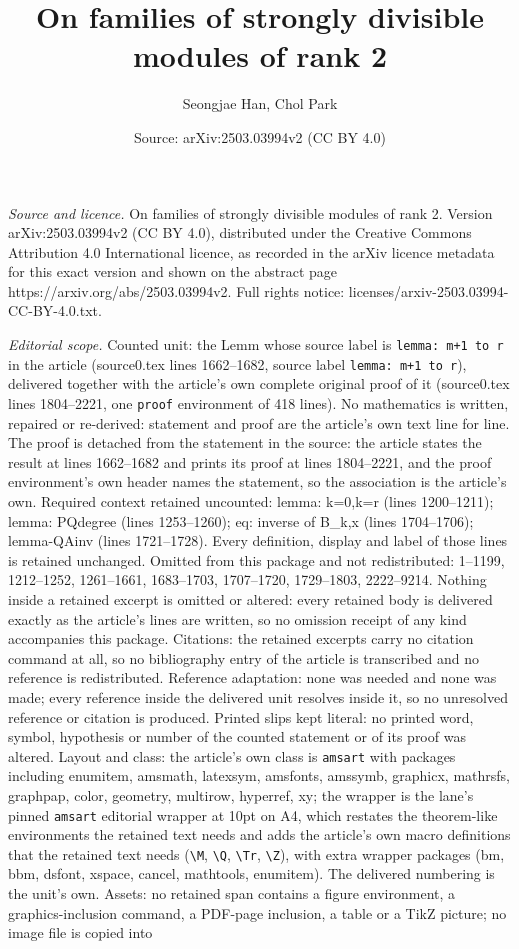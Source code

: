 \documentclass[10pt,a4paper]{amsart}
\title[On families of strongly divisible modules of rank 2]{On families of strongly divisible modules of rank 2}
\author{Seongjae Han, Chol Park}
\date{Source: arXiv:2503.03994v2 (CC BY 4.0)}
\begin{document}
\maketitle

\noindent\emph{Source and licence.} On families of strongly divisible modules of rank 2. Version arXiv:2503.03994v2 (CC BY 4.0), distributed under the Creative Commons Attribution 4.0 International licence, as recorded in the arXiv licence metadata for this exact version and shown on the abstract page https://arxiv.org/abs/2503.03994v2. Full rights notice: licenses/arxiv-2503.03994-CC-BY-4.0.txt.\par\smallskip

\noindent\textit{Editorial scope.} Counted unit: the Lemm whose source label is \texttt{lemma: m+1 to r} in the article (source0.tex lines 1662--1682, source label \texttt{lemma: m+1 to r}), delivered together with the article's own complete original proof of it (source0.tex lines 1804--2221, one \texttt{proof} environment of 418 lines). No mathematics is written, repaired or re-derived: statement and proof are the article's own text line for line. The proof is detached from the statement in the source: the article states the result at lines 1662--1682 and prints its proof at lines 1804--2221, and the proof environment's own header names the statement, so the association is the article's own. Required context retained uncounted: lemma: k=0,k=r (lines 1200--1211); lemma: PQdegree (lines 1253--1260); eq: inverse of B\_k,x (lines 1704--1706); lemma-QAinv (lines 1721--1728). Every definition, display and label of those lines is retained unchanged. Omitted from this package and not redistributed: 1--1199, 1212--1252, 1261--1661, 1683--1703, 1707--1720, 1729--1803, 2222--9214. Nothing inside a retained excerpt is omitted or altered: every retained body is delivered exactly as the article's lines are written, so no omission receipt of any kind accompanies this package. Citations: the retained excerpts carry no citation command at all, so no bibliography entry of the article is transcribed and no reference is redistributed. Reference adaptation: none was needed and none was made; every reference inside the delivered unit resolves inside it, so no unresolved reference or citation is produced. Printed slips kept literal: no printed word, symbol, hypothesis or number of the counted statement or of its proof was altered. Layout and class: the article's own class is \texttt{amsart} with packages including enumitem, amsmath, latexsym, amsfonts, amssymb, graphicx, mathrsfs, graphpap, color, geometry, multirow, hyperref, xy; the wrapper is the lane's pinned \texttt{amsart} editorial wrapper at 10pt on A4, which restates the theorem-like environments the retained text needs and adds the article's own macro definitions that the retained text needs (\texttt{\textbackslash M}, \texttt{\textbackslash Q}, \texttt{\textbackslash Tr}, \texttt{\textbackslash Z}), with extra wrapper packages (bm, bbm, dsfont, xspace, cancel, mathtools, enumitem). The delivered numbering is the unit's own. Assets: no retained span contains a figure environment, a graphics-inclusion command, a PDF-page inclusion, a table or a TikZ picture; no image file is copied into 
\end{document}
